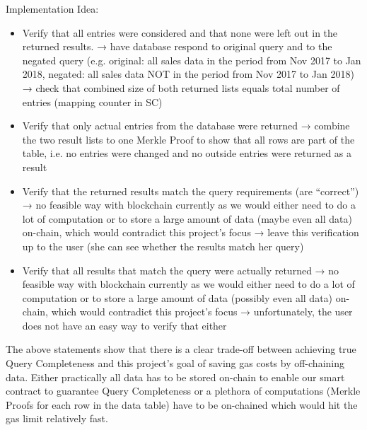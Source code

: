 Implementation Idea:
\begin{itemize}
\item Verify that all entries were considered and that none were left out in the returned results.
→  have database respond to original query and to the negated query (e.g. original: all sales data in the period from Nov 2017 to Jan 2018, negated: all sales data NOT in the period from Nov 2017 to Jan 2018)
→ check that combined size of both returned lists equals total number of entries (mapping counter in SC)
\item Verify that only actual entries from the database were returned
→ combine the two result lists to one Merkle Proof to show that all rows are part of the table, i.e. no entries were changed and no outside entries were returned as a result
\item Verify that the returned results match the query requirements (are “correct”)
→ no feasible way with blockchain currently as we would either need to do a lot of computation or to store a large amount of data (maybe even all data) on-chain, which would contradict this project’s focus
→ leave this verification up to the user (she can see whether the results match her query)
\item Verify that all results that match the query were actually returned
→ no feasible way with blockchain currently as we would either need to do a lot of computation or to store a large amount of data (possibly even all data) on-chain, which would contradict this project’s focus
→ unfortunately, the user does not have an easy way to verify that either
\end{itemize}
The above statements show that there is a clear trade-off between achieving true Query Completeness and this project’s goal of saving gas costs by off-chaining data. Either practically all data has to be stored on-chain to enable our smart contract to guarantee Query Completeness or a plethora of computations (Merkle Proofs for each row in the data table) have to be on-chained which would hit the gas limit relatively fast.

